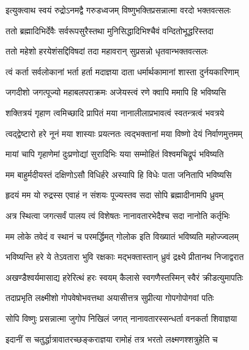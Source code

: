 
\twolineshloka
{इत्युक्त्वाथ स्वयं रुद्रोऽनमद्वै गरुडध्वजम्}
{विष्णुभक्तिप्रसन्नात्मा वरदो भक्तवत्सलः} %

\twolineshloka
{ततो ब्रह्मादिभिर्देवैः सर्वरूपसुरैस्तथा}
{मुनिसिद्धादिभिश्चैवं वन्दितोभूद्धरिस्तदा} %

\twolineshloka
{ततो महेशो हरयेशंसद्दिविषदां तदा}
{महावरान् सुप्रसन्नो धृतवान्भक्तवत्सलः} %


\twolineshloka
{त्वं कर्ता सर्वलोकानां भर्ता हर्ता मदाज्ञया}
{दाता धर्मार्थकामानां शास्ता दुर्नयकारिणाम्} %

\twolineshloka
{जगदीशो जगत्पूज्यो महाबलपराक्रमः}
{अजेयस्त्वं रणे क्वापि ममापि हि भविष्यसि} %

\twolineshloka
{शक्तित्रयं गृहाण त्वमिच्छादि प्रापितं मया}
{नानालीलाप्रभावत्वं स्वतन्त्रत्वं भवत्रये} %

\twolineshloka
{त्वद्द्वेष्टारो हरे नूनं मया शास्याः प्रयत्नतः}
{त्वद्भक्तानां मया विष्णो देयं निर्वाणमुत्तमम्} %

\twolineshloka
{मायां चापि गृहाणेमां दुःप्रणोद्यां सुरादिभिः}
{यया सम्मोहितं विश्वमचिद्रूपं भविष्यति} %

\twolineshloka
{मम बाहुर्मदीयस्तं दक्षिणोऽसौ विधिर्हरे}
{अस्यापि हि विधेः पाता जनितापि भविष्यसि} %

\twolineshloka
{हृदयं मम यो रुद्रस्स एवाहं न संशयः}
{पूज्यस्तव सदा सोपि ब्रह्मादीनामपि ध्रुवम्} %

\twolineshloka
{अत्र स्थित्वा जगत्सर्वं पालय त्वं विशेषतः}
{नानावतारभेदैश्च सदा नानोति कर्तृभिः} %

\twolineshloka
{मम लोके तवेदं व स्थानं च परमर्द्धिमत्}
{गोलोक इति विख्यातं भविष्यति महोज्ज्वलम्} %

\twolineshloka
{भविष्यन्ति हरे ये तेऽवतारा भुवि रक्षकाः}
{मद्भक्तास्तान् ध्रुवं द्रक्ष्ये प्रीतानथ निजाद्वरात} %


\twolineshloka
{अखण्डैश्वर्यमासाद्य हरेरित्थं हरः स्वयम्}
{कैलासे स्वगणैस्तस्मिन् स्वैरं क्रीडत्युमापतिः} %

\twolineshloka
{तदाप्रभृति लक्ष्मीशो गोपवेषोभवत्तथा}
{अयासीत्तत्र सुप्रीत्या गोपगोपोगवां पतिः} %

\twolineshloka
{सोपि विष्णुः प्रसन्नात्मा जुगोप निखिलं जगत्}
{नानावतारस्सन्धर्ता वनकर्ता शिवाज्ञया} %

\twolineshloka
{इदानीं स चतुर्द्धात्रावातरच्छङ्कराज्ञया}
{रामोहं तत्र भरतो लक्ष्मणश्शत्रुहेति च} %

